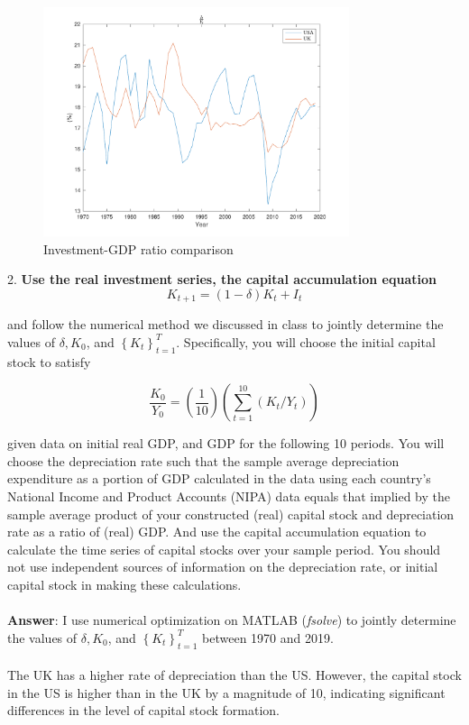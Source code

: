 \documentclass[12pt]{article}
\theoremstyle{mytheoremstyle}
\theoremstyle{mytheoremstyle}
\theoremstyle{myproblemstyle}
\begin{document}
\begin{figure}[h]
    \includegraphics[width=0.8\textwidth]{out/Investment.pdf}
    \centering
    \caption{Investment-GDP ratio comparison}
    \label{fig:inv-gdp}
\end{figure}


2. \textbf{Use the real investment series, the capital accumulation equation}
$$
K_{t+1}=(1-\delta) K_t+I_t
$$

and follow the numerical method we discussed in class to jointly determine the values of $\delta, K_0$, and $\left\{K_t\right\}_{t=1}^T$. Specifically, you will choose the initial capital stock to satisfy

$$
\frac{K_0}{Y_0}=\left(\frac{1}{10}\right)\left(\sum_{t=1}^{10}\left(K_t / Y_t\right)\right)
$$

\noindent given data on initial real GDP, and GDP for the following 10 periods. You will choose the depreciation rate such that the sample average depreciation expenditure as a portion of GDP calculated in the data using each country's National Income and Product Accounts (NIPA) data equals that implied by the sample average product of your constructed (real) capital stock and depreciation rate as a ratio of (real) GDP. And use the capital accumulation equation to calculate the time series of capital stocks over your sample period. You should not use independent sources of information on the depreciation rate, or initial capital stock in making these calculations.
\\ \\ 
\textbf{Answer}: I use numerical optimization on MATLAB (\textit{fsolve}) to jointly determine the values of $\delta, K_0$, and $\left\{K_t\right\}_{t=1}^T$ between 1970 and 2019. 
\\ \\ 
The UK has a higher rate of depreciation than the US. However, the capital stock in the US is higher than in the UK by a magnitude of 10, indicating significant differences in the level of capital stock formation.
\end{document}
